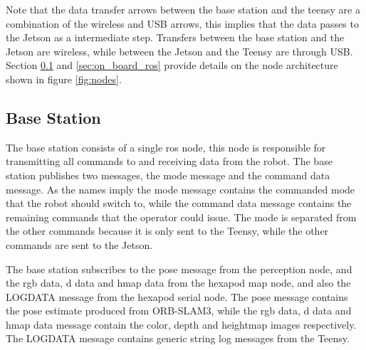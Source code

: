     \noindent
    Note that the data transfer arrows between the base station and the teensy are a combination of the wireless and USB arrows, this implies that the data passes to the Jetson as a intermediate step. Transfers between the base station and the Jetson are wireless, while between the Jetson and the Teensy are through USB. Section \ref{sec:base_ros} and \ref{sec:on_board_ros} provide details on the node architecture shown in figure \ref{fig:nodes}.
    \subsection{Base Station} \label{sec:base_ros}
        The base station consists of a single \ac{ros} node, this node is responsible for transmitting all commands to and receiving data from the robot. The base station publishes two messages, the mode message and the command data message. As the names imply the mode message contains the commanded mode that the robot should switch to, while the command data message contains the remaining commands that the operator could issue. The mode is separated from the other commands because it is only sent to the Teensy, while the other commands are sent to the Jetson.
        
        The base station subscribes to the pose message from the perception node, and the rgb data, d data and hmap data from the hexapod map node, and also the LOGDATA message from the hexapod serial node. The pose message contains the pose estimate produced from ORB-SLAM3, while the rgb data, d data and hmap data message contain the color, depth and heightmap images respectively. The LOGDATA message contains generic string log messages from the Teensy.
        
